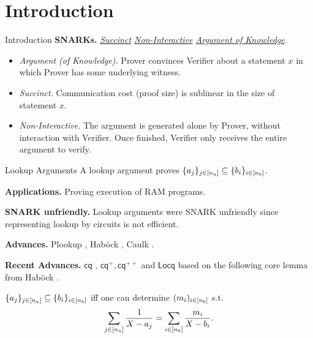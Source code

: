 \section{Introduction}
\begin{frame}{Introduction}
	\textbf{SNARKs.} \textit{\underline{Succinct} \underline{Non-Interactive} \underline{Argument of Knowledge}}.
	\begin{itemize}
		\item \textit{Argument (of Knowledge).} Prover convinces Verifier about a statement $x$ in which Prover has some underlying witness.
		\item \textit{Succinct.} Communication cost (proof size) is sublinear in the size of statement $x$.
		\item \textit{Non-Interactive.} The argument is generated alone by Prover, without interaction with Verifier. Once finished, Verifier only receives the entire argument to verify.
	\end{itemize}
\end{frame}
\begin{frame}{Lookup Arguments}
	A lookup argument \cite{AC:BCGJM18} proves $\{a_j\}_{j \in [{n_a}]} \subseteq \{b_i\}_{i \in [{n_b}]}$.
	
	\textbf{Applications.} Proving execution of RAM programs.
	
	\textbf{SNARK unfriendly.} Lookup arguments were SNARK unfriendly since representing lookup by circuits is not efficient.
	
	\textbf{Advances.} Plookup \cite{EPRINT:GabWil20}, Hab{\"o}ck \cite{EPRINT:Habock22b}, Caulk \cite{CCS:ZBKMNS22}.
	
	\textbf{Recent Advances.} $\mathsf{cq}$ \cite{EPRINT:EagFioGab22}, $\mathsf{cq}^+, \mathsf{cq}^{++}$ \cite{PKC:CFFLL24} and $\mathsf{Locq}$ \cite{PKC:ZSG24} based on the following core lemma from Hab{\"o}ck \cite{EPRINT:Habock22b}.
	\begin{lemma}
		$\{a_j\}_{j \in [{n_a}]} \subseteq \{b_i\}_{i \in [{n_b}]}$ iff one can determine $(m_i)_{i \in [{n_b}]}$ s.t.
		\begin{equation*}
			\sum_{j \in [{n_a}]}\frac{1}{X - a_j} = \sum_{i \in [{n_b}]}\frac{m_i}{X - b_i}.
		\end{equation*}
	\end{lemma}
\end{frame}

